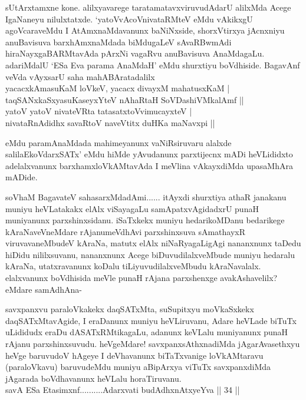 \begin{artha}
sUtArxtamxne kone. alilxyavarege taratamatavxviruvudAdarU alilxMda Acege IgaNaneyu nilulxtatxde. `yatoVvAcoVnivataRMteV eMdu vAkikxgU agoVcaraveMdu I AtAmxnaMdavanunx baNiNxside, shorxVtirxya jAcnxniyu anuBavisuva barxhAmxnaMdada biMdugaLeV sAvaRBwmAdi hiraNayxgaBARMtavAda pArxNi vagaRvu anuBavisuva AnaMdagaLu. adariMdalU `ESa Eva parama AnaMdaH' eMdu shurxtiyu boVdhiside. BagavAnf veVda vAyxsarU saha mahABAratadalilx\\
yacacxkAmasuKaM loVkeV, yacacx divayxM mahatusxKaM |\\
taqSANxkaSxyasuKaseyxYteV nAhaRtaH SoVDashiVMkalAmf ||\\
yatoV yatoV nivateVRta tatasatxtoVvimucayxteV |\\
nivataRnAdidhx savaRtoV naveVtitx duHKa maNavxpi ||
\end{artha}%

\begin{artha}
eMdu paramAnaMdada mahimeyanunx vaNiRsiruvaru alalxde salilaEkoVdarxSATx' eMdu hiMde yAvudanunx parxtijecnx mADi heVLididxto adelalxvanunx barxhamxloVkAMtavAda I meVlina vAkayxdiMda upasaMhAra mADide. 
\end{artha}

\begin{artha}
soV\s haM BagavateV sahasarxMdadAmi...... itAyxdi shurxtiya athaR janakanu muniyu heVLatakakx elAlx viSayagaLu samApatxvAgidadxrU punaH muniyanunx parxshinxsidanu. iSaTxkekx muniyu hedarikoMDanu bedarikege kAraNaveVneMdare rAjanumeVdhAvi parxshinxsuva sAmathayxR viruvavaneMbudeV kAraNa, matutx elAlx niNaRyagaLigAgi nananxnunx taDedu hiDidu nililxsuvanu, nananxnunx Acege biDuvudilalxveMbude muniyu hedaralu kAraNa, utatxravanunx koDalu tiLiyuvudilalxveMbudu kAraNavalalx. elalxvanunx boVdhisida meVle punaH rAjana parxshenxge avakAshavelilx? eMdare samAdhAna-
\end{artha}

\begin{artha}
savxpanxvu paraloVkakekx daqSATxMta, suSupitxyu moVkaSxkekx daqSATxMtavAgide, I eraDanunx muniyu heVLiruvanu, Adare heVLade biTuTx uLididudx eraDu dASATxRMtikagaLu, adanunx keVLalu muniyanunx punaH rAjanu parxshinxsuvudu. heVgeMdare! savxpanxsAthxnadiMda jAgarAvasethxyu heVge baruvudoV hAgeye I deVhavanunx biTaTxvanige loVkAMtaravu (paraloVkavu) baruvudeMdu muniyu aBipArxya viTuTx savxpanxdiMda jAgarada boVdhavanunx heVLalu horaTiruvanu.\\
savA ESa Etasimxnf..........Adarxvati budAdhxnAtxyeYva || 34 ||
\end{artha}%

